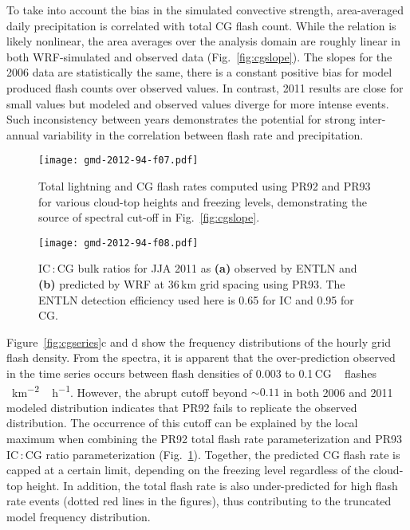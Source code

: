 To take into account the bias in the simulated convective strength,
area-averaged daily precipitation is correlated with total CG flash count.
While the relation is likely nonlinear, the area averages over the analysis
domain are roughly linear in both WRF-simulated and observed data
(Fig.~\ref{fig:cgslope}). The slopes for the 2006 data are statistically the
same, there is a constant positive bias for model produced flash counts over
observed values. In contrast, 2011 results are close for small values but
modeled and observed values diverge for more intense events. Such
inconsistency between years demonstrates the potential for strong
inter-annual variability in the correlation between flash rate and
precipitation.



\begin{figure}[t]
\texttt{[image: gmd-2012-94-f07.pdf]}
\caption{Total lightning and CG flash rates computed using PR92 and PR93 for
various cloud-top heights and freezing levels, demonstrating the source of
spectral cut-off in Fig.~\ref{fig:cgslope}.} \label{fig:pr9293}
\end{figure}

\begin{figure}[t]
\texttt{[image: gmd-2012-94-f08.pdf]}
\caption{IC\,:\,CG bulk ratios for JJA 2011 as \textbf{(a)} observed by
 ENTLN and \textbf{(b)} predicted by WRF at 36\,\unit{km} grid spacing
 using PR93. The ENTLN detection efficiency used here is
 0.65 for IC and 0.95 for CG. }
 \label{fig:iccgmap}
\end{figure}






Figure~\ref{fig:cgseries}c and d show the frequency
distributions of the hourly grid flash density. From the spectra, it is
apparent that the over-prediction observed in the time series occurs between
flash densities of 0.003 to 0.1\,\unit{CG\,flashes\,km^{-2}\,h^{-1}}.
However, the abrupt cutoff beyond $\sim0.11$ in both 2006 and 2011 modeled
distribution indicates that PR92 fails to replicate the observed
distribution. The occurrence of this cutoff can be explained by the local
maximum when combining the PR92 total flash rate parameterization and PR93
IC\,:\,CG ratio parameterization (Fig.~\ref{fig:pr9293}). Together, the
predicted CG flash rate is capped at a certain limit, depending on the
freezing level regardless of the cloud-top height. In addition, the total
flash rate is also under-predicted for high flash rate events (dotted red
lines in the figures), thus contributing to the truncated model frequency
distribution.

